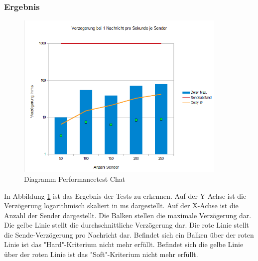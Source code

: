 \subsubsection{Ergebnis}
\begin{figure}[htH]
\centering
\includegraphics[width=0.9\textwidth]{backend/Diagramm_Performance_Chat.PNG}
\caption{Diagramm Performancetest Chat}
\label{backfig16}
\end{figure}
In Abbildung \ref{backfig16} ist das Ergebnis der Tests zu erkennen. 
Auf der Y-Achse ist die Verzögerung logarithmisch skaliert in ms dargestellt.
Auf der X-Achse ist die Anzahl der Sender dargestellt.
Die Balken stellen die maximale Verzögerung dar. 
Die gelbe Linie stellt die durchschnittliche Verzögerung dar.
Die rote Linie stellt die Sende-Verzögerung pro Nachricht dar.
Befindet sich ein Balken über der roten Linie ist das "Hard"-Kriterium nicht mehr erfüllt.
Befindet sich die gelbe Linie über der roten Linie ist das "Soft"-Kriterium nicht mehr erfüllt.



